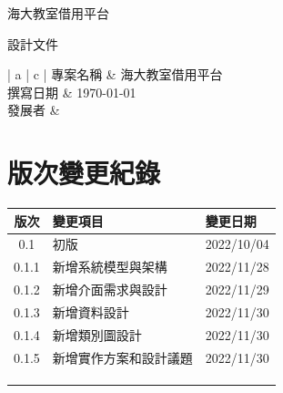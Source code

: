 \documentclass{article}
\begin{document}
\begin{titlepage}
	\centering

	{\huge 海大教室借用平台}

	\vfill

	{\huge 設計文件}

	\vfill

	\begin{Large}
		\begin{center}
			\begin{tabular}{| a | c |}
				\hline
				專案名稱 & 海大教室借用平台               \\ \hline
				撰寫日期 & \today                 \\ \hline
				發展者  &  \\ \hline
			\end{tabular}
		\end{center}
	\end{Large}
\end{titlepage}


\section*{版次變更紀錄}

\begin{tabularx}{\textwidth}{| c | X | X |}
	\rowcolor{LightGray}
	\hline
	版次    & 變更項目        & 變更日期       \\ \hline
	0.1   & 初版          & 2022/10/04 \\ \hline
	0.1.1 & 新增系統模型與架構   & 2022/11/28 \\ \hline
	0.1.2 & 新增介面需求與設計   & 2022/11/29 \\ \hline
	0.1.3 & 新增資料設計      & 2022/11/30 \\ \hline
	0.1.4 & 新增類別圖設計     & 2022/11/30 \\ \hline
	0.1.5 & 新增實作方案和設計議題 & 2022/11/30 \\ \hline
	      &             &            \\ \hline
	      &             &            \\ \hline
	      &             &            \\ \hline
\end{tabularx}

\newpage

\begin{center}
	\tableofcontents
\end{center}
\end{document}

